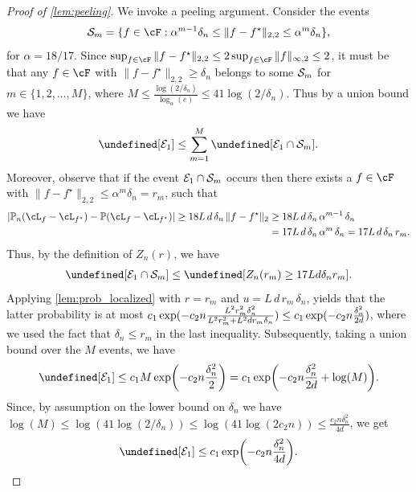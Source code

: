 \documentclass[11pt]{article} %
\newcommand{\pref}[1]{\cref{#1}}
\theoremstyle{theorem}  %
\theoremstyle{plain}
\DeclarePairedDelimiter{\prn}{(}{)}
\let\Pr\undefined
\DeclareMathOperator{\Pr}{Pr}
\newcommand{\Pn}{\ensuremath{\mathbb{P}}}
\begin{document}
\begin{proof}[Proof of \pref{lem:peeling}]
We invoke a peeling argument. Consider the events
\begin{equation*}
  {\cal S}_m = \{f \in \cF: \alpha^{m-1}\delta_n \leq \|f - f^{\star}\|_{2,2} \leq \alpha^m \delta_n\},
\end{equation*}
for $\alpha=18/17$. Since $\sup_{f \in \cF} \|f-f^{\star}\|_{2,2} \leq 2\sup_{f \in \cF} \|f\|_{\infty,2} \leq 2$, it must be that any $f \in \cF$ with $\|f-f^{\star}\|_{2,2}\geq \delta_n$ belongs to some ${\cal S}_m$ for $m\in \{1, 2, \ldots, M\}$, where $M\leq \frac{\log(2/\delta_n)}{\log_{\alpha}(e)}\leq 41 \log(2/\delta_n)$. Thus by a union bound we have
\begin{equation*}
\Pr[{\cal E}_1] \leq \sum_{m=1}^M \Pr[{\cal E}_1 \cap {\cal S}_m].
\end{equation*}
Moreover, observe that if the event ${\cal E}_1\cap {\cal S}_m$ occurs then there exists a $f\in \cF$ with $\|f - f^{\star}\|_{2,2} \leq \alpha^m \delta_n = r_m$, such that
\begin{align*}
\left| \Pn_n (\cL_{f} - \cL_{f^{\star}}) - \Pn (\cL_{f} - \cL_{f^{\star}}) \right|  \geq 18 L\,d\, \delta_n\, \|f - f^{\star}\|_2 &\geq 18 L\,d\, \delta_n\, \alpha^{m-1}\, \delta_n \\&= 17 L\, d\, \delta_n\, \alpha^{m}\, \delta_n = 17 L\, d\, \delta_n\, r_m.
\end{align*}
Thus, by the definition of $Z_n(r)$, we have
\begin{align*}
\Pr[{\cal E}_1 \cap {\cal S}_m] \leq \Pr[Z_n(r_m) \geq 17 L d \delta_n r_m].
\end{align*}
Applying \pref{lem:prob_localized} with $r=r_m$ and $u=L\, d\, r_m\,\delta_n$, yields that the latter probability is at most $c_1 \exp\prn{ - c_2 n \frac{L^2 r_m^2 \delta_n^2}{L^2 r_m^2 + L^2 d r_m \delta_n}}\leq c_1 \exp\prn{ - c_2 n \frac{\delta_n^2}{2d}}$, where we used the fact that $\delta_n \leq r_m$ in the last inequality.  Subsequently, taking a union bound over the $M$ events, we have
\begin{equation}
\Pr[{\cal E}_1] \leq c_1 M \exp\prn*{-c_2 n \frac{\delta_n^2}{2}} = c_1 \exp\prn*{-c_2 n \frac{\delta_n^2}{2d} + \log(M)}.
\end{equation}
Since, by assumption on the lower bound on $\delta_n$ we have $\log(M)\leq \log(41 \log(2/\delta_n)) \leq \log(41 \log(2 c_2 n)) \leq \frac{c_2 n \delta_n^2}{4d}$, we get
\begin{equation}
\Pr[{\cal E}_1] \leq  c_1 \exp\prn*{-c_2 n \frac{\delta_n^2}{4d}}.
\end{equation}
\end{proof}
\end{document}
